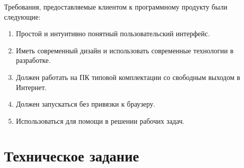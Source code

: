 \documentclass{altsu-report}
\begin{document}
Требования, предоставляемые клиентом к программному продукту были следующие:

\begin{enumerate}
    \item Простой и интуитивно понятный пользовательский интерфейс.

    \item Иметь современный дизайн и использовать современные технологии в разработке.

    \item Должен работать на ПК типовой комплектации со свободным выходом в Интернет.

    \item Должен запускаться без привязки к браузеру.

    \item Использоваться для помощи в решении рабочих задач.
\end{enumerate}

\chapter*{Техническое задание}
\end{document}
